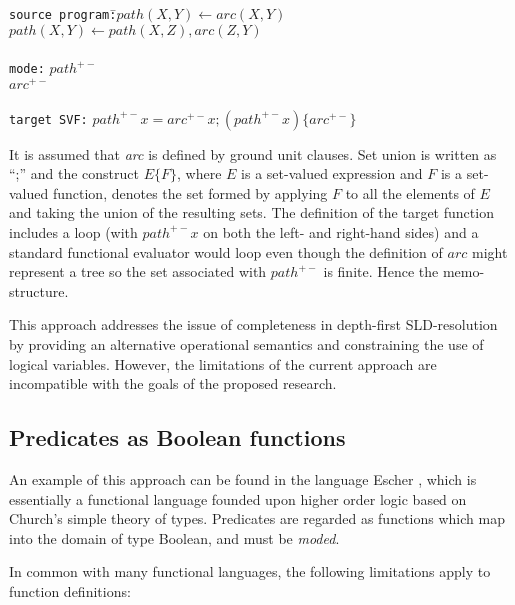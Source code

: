 \begin{tabbing}
\texttt{source program:}\quad\=$\mathit{path}(X, Y) \leftarrow \mathit{arc}(X,Y)$\\
\>                             $\mathit{path}(X, Y) \leftarrow \mathit{path}(X, Z),
				\mathit{arc}(Z, Y)$\\
\\
\texttt{mode:}\>               $\mathit{path}^{+-}$\\
\>                             $\mathit{arc}^{+-}$\\
\\
\texttt{target SVF:}\>         $\mathit{path}^{+-} x = \mathit{arc}^{+-} x;
				(\mathit{path}^{+-} x)\{\mathit{arc}^{+-}\}$
\end{tabbing}

It is assumed that \textit{arc} is defined by ground unit clauses.  Set union is written
as ``;'' and the construct $E\{F\}$, where $E$ is a set-valued expression and $F$ is a
set-valued function, denotes the set formed by applying $F$ to all the elements of $E$
and taking the union of the resulting sets.  The definition of the target function includes
a loop (with $path^{+-} x$ on both the left- and right-hand sides) and a standard functional
evaluator would loop even though the definition of $arc$ might represent a tree so the
set associated with $path^{+-}$ is finite.  Hence the memo-structure.

This approach addresses the issue of completeness in depth-first SLD-resolution by providing
an alternative operational semantics and constraining the use of logical variables.
However, the
limitations of the current approach are incompatible with the goals of the proposed research.

\subsection{Predicates as Boolean functions}

An example of this approach can be found in the language Escher \cite{Llo94},  which is
essentially a functional language
founded upon higher order logic based on Church's simple theory of types.  Predicates are
regarded as functions which map into the domain of type Boolean, and must be \textit{moded}.

In common with many functional languages, the following limitations apply to function
definitions:

